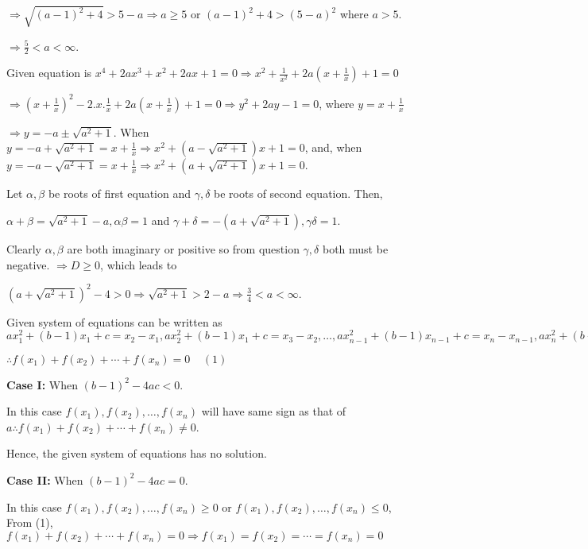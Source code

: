   $\Rightarrow \sqrt{(a - 1)^2 + 4} > 5 - a \Rightarrow a\geq 5$ or $(a - 1)^2 + 4 > (5 - a)^2$ where $a >
  5$.

  $\Rightarrow \frac{5}{2} < a < \infty$.
\item Given equation is $x^4 + 2ax^3 + x^2 + 2ax + 1 = 0 \Rightarrow x^2 + \frac{1}{x^2} + 2a\left(x +
  \frac{1}{x}\right) + 1 = 0$

  $\Rightarrow \left(x + \frac{1}{x}\right)^2 - 2.x.\frac{1}{x} + 2a\left(x + \frac{1}{x}\right) + 1 = 0
  \Rightarrow y^2 + 2ay - 1 = 0$, where $y = x + \frac{1}{x}$

  $\Rightarrow y = -a\pm\sqrt{a^2 + 1}$. When $y = -a + \sqrt{a^2 + 1} = x + \frac{1}{x}\Rightarrow x^2 + (a
  - \sqrt{a^2 + 1})x + 1 = 0$, and, when $y = -a - \sqrt{a^2 + 1} = x + \frac{1}{x}\Rightarrow x^2 + (a +
  \sqrt{a^2 + 1})x + 1 = 0$.

  Let $\alpha,\beta$ be roots of first equation and $\gamma,\delta$ be roots of second equation. Then,

  $\alpha + \beta = \sqrt{a^2 + 1} - a, \alpha\beta = 1$ and $\gamma + \delta = -(a + \sqrt{a^2 + 1}),
  \gamma\delta = 1$.

  Clearly $\alpha, \beta$ are both imaginary or positive so from question $\gamma, \delta$ both must be
  negative. $\Rightarrow D\geq 0$, which leads to

  $(a + \sqrt{a^2 + 1})^2 - 4 > 0 \Rightarrow \sqrt{a^2 + 1} > 2 - a \Rightarrow \frac{3}{4} < a < \infty$.
\item Given system of equations can be written as $ax_1^2 + (b - 1)x_1 + c = x_2 - x_1, ax_2^2 + (b - 1)x_1
  + c = x_3 - x_2, \ldots, ax_{n - 1}^2 + (b - 1)x_{n - 1} + c = x_n - x_{n - 1}, ax_n^2 + (b - 1)x_n + c =
  x_1 - x_n$

  $\therefore f(x_1) + f(x_2) + \cdots + f(x_n) = 0\;\;\;\;(1)$

  {\bf Case I:} When $(b - 1)^2 - 4ac < 0$.

  In this case $f(x_1), f(x_2), \ldots, f(x_n)$ will have same sign as that of $a\therefore f(x_1) + f(x_2)
  + \cdots + f(x_n)\neq 0$.

  Hence, the given system of equations has no solution.

  {\bf Case II:} When $(b - 1)^2 - 4ac = 0$.

  In this case $f(x_1), f(x_2), \ldots, f(x_n) \geq 0$ or $f(x_1), f(x_2), \ldots, f(x_n)\leq 0$, From (1),
  $f(x_1) + f(x_2) + \cdots + f(x_n) = 0 \Rightarrow f(x_1) = f(x_2) = \cdots = f(x_n) = 0$

